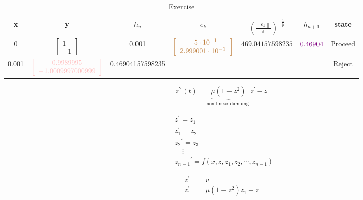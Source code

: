 \begin{table}[ht]
    \centering
    \begin{tabular}{|c|c|c|c|c|c|c|}
    \hline x & y &  $h_n$ & $e_k$ & $\left(\frac{\left\|e_k\right\|}{\varepsilon}\right)^{-\frac{1}{\widetilde{p}}}$ & $h_{n+1}$&state\\
    \hline
    0& $\left[\begin{array}{cc}
    1\\
    -1
    \end{array}\right]$& 0.001 &$\textcolor{brown}{\left[\begin{array}{cc}
    -5\cdot 10^{-1}\\ 
    2.999001\cdot 10^{-1}
    \end{array}\right]}$&$469.04157598235$&$\textcolor{violet}{0.46904}$&Proceed\\
    \hline
    0.001& $\textcolor{pink}{\left[\begin{array}{cc}
    0.9989995\\ 
    -1.0009997000999
    \end{array}\right]}$&0.46904157598235&&&&Reject\\
    \hline
    \end{tabular}
    \caption{Exercise}
    \label{tab:example_tab}
\end{table}

\begin{equation}
z^{\prime \prime}(t)=\underbrace{\mu\left(1-z^2\right)}_{\text {non-linear damping }} z^{\prime}-z
\end{equation}

\begin{equation}
\begin{aligned}
& z^{\prime}=z_1 \\
& z_1^{\prime}=z_2 \\
& z_2{ }^{\prime}=z_3 \\
& \quad \vdots \\
& z_{n-1}{ }^{\prime}=f\left(x, z, z_1, z_2, \cdots, z_{n-1}\right)
\end{aligned}
\end{equation}

\begin{equation}
\begin{aligned}
z^{\prime} & =v \\
z_1^{\prime} & =\mu\left(1-z^2\right) z_1-z
\end{aligned}
\end{equation}



